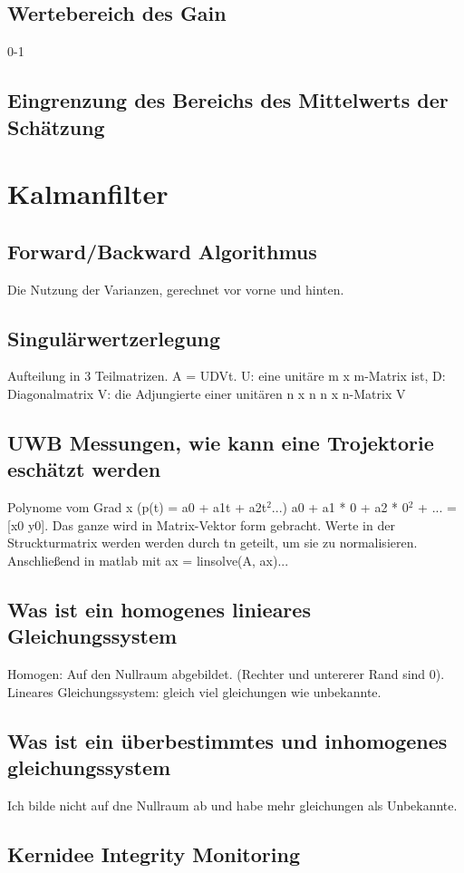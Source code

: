 \subsection{Wertebereich des Gain}
0-1

\subsection{Eingrenzung des Bereichs des Mittelwerts der Schätzung}


\section{Kalmanfilter}
\label{sec:faq:kalmanfilter}


\subsection{Forward/Backward Algorithmus}
Die Nutzung der Varianzen, gerechnet vor vorne und hinten.
\subsection{Singulärwertzerlegung}
 Aufteilung in 3 Teilmatrizen. A = UDVt. U: eine unitäre  m x m-Matrix ist, D: Diagonalmatrix V:  die Adjungierte einer unitären n x n  n x n-Matrix V
\subsection{UWB Messungen, wie kann eine Trojektorie eschätzt werden}
Polynome vom Grad x (p(t) = a0 + a1t + a2t$^2$...) a0 + a1 * 0 + a2 * 0$^2$ + ... = [x0 y0]. Das ganze wird in Matrix-Vektor form gebracht.  Werte in der Struckturmatrix werden werden durch tn geteilt, um sie zu normalisieren. Anschließend in matlab mit ax = linsolve(A, ax)... 
\subsection{Was ist ein homogenes linieares Gleichungssystem}
Homogen: Auf den Nullraum abgebildet. (Rechter und untererer Rand sind 0). Lineares Gleichungssystem: gleich viel gleichungen wie unbekannte.
\subsection{Was ist ein überbestimmtes und inhomogenes gleichungssystem}
Ich bilde nicht auf dne Nullraum ab und habe mehr gleichungen als Unbekannte.

\subsection{Kernidee Integrity Monitoring}

